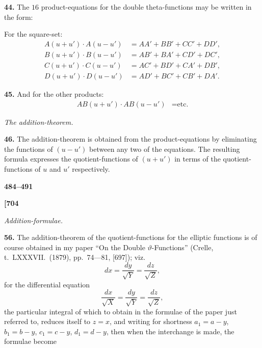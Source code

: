 \documentclass[12pt,a4paper]{article}
\theoremstyle{definition}
\begin{document}
\vspace{0.5em}

\noindent\textbf{44.}\quad
The $16$ product-equations for the double theta-functions may be written in the form:

For the square-set:
\begin{align*}
A(u + u') \cdot A(u - u') &= AA' + BB' + CC' + DD', \\
B(u + u') \cdot B(u - u') &= AB' + BA' + CD' + DC', \\
C(u + u') \cdot C(u - u') &= AC' + BD' + CA' + DB', \\
D(u + u') \cdot D(u - u') &= AD' + BC' + CB' + DA'.
\end{align*}

\noindent\textbf{45.}\quad
And for the other products:
\begin{align*}
AB(u + u') \cdot AB(u - u') &= \text{etc.}
\end{align*}

\vspace{1em}

\begin{center}
\textit{The addition-theorem.}
\end{center}

\vspace{0.5em}

\noindent\textbf{46.}\quad
The addition-theorem is obtained from the product-equations by eliminating the functions of $(u - u')$ between any two of the equations. The resulting formula expresses the quotient-functions of $(u + u')$ in terms of the quotient-functions of $u$ and $u'$ respectively.

\vspace{1em}

\begin{center}
\textbf{484--491}
\end{center}

\vspace{0.5em}

\noindent\textbf{[704}

\vspace{0.5em}

\begin{center}
\textit{Addition-formulae.}
\end{center}

\vspace{0.5em}

\noindent\textbf{56.}\quad
The addition-theorem of the quotient-functions for the elliptic functions is of course obtained in my paper ``On the Double $\vartheta$-Functions'' (Crelle, t.~LXXXVII.\ (1879), pp.~74---81, [697]); viz.
\[
dx = \frac{dy}{\sqrt{Y}} = \frac{dz}{\sqrt{Z}},
\]
for the differential equation
\[
\frac{dx}{\sqrt{X}} = \frac{dy}{\sqrt{Y}} = \frac{dz}{\sqrt{Z}},
\]
the particular integral of which to obtain in the formulae of the paper just referred to, reduces itself to $z = x$, and writing for shortness $a_1 = a - y$, $b_1 = b - y$, $c_1 = c - y$, $d_1 = d - y$, then when the interchange is made, the formulae become
\end{document}
